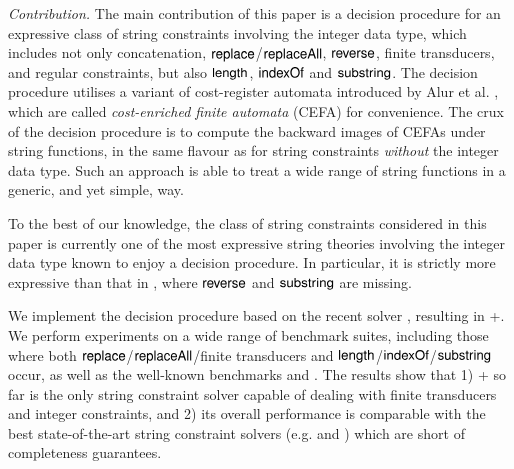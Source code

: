 \noindent\emph{Contribution.} The main contribution of this paper is a decision procedure for an expressive class of string constraints involving the integer data type, which includes not only concatenation, $\mathsf{replace}$/$\mathsf{replaceAll}$, $\mathsf{reverse}$, finite transducers, and regular constraints, but also $\mathsf{length}$, $\mathsf{indexOf}$ and $\mathsf{substring}$. The decision procedure utilises a variant of cost-register automata introduced by Alur et al. \cite{RLJ+13}, which are called \emph{cost-enriched finite automata} (CEFA) for convenience. The crux of the decision procedure is to compute the backward images of CEFAs under string functions,  in the same flavour as \cite{CHL+19} for string constraints \emph{without} the integer data type. Such an approach %
is able to treat %
a wide range of string functions in a generic, and yet simple, way. 

To the best of our knowledge, the class of string constraints considered in this paper is currently one of the most expressive string theories involving the integer data type known to enjoy a decision procedure. In particular, it is strictly more expressive than that in \cite{LB16}, where $\mathsf{reverse}$ and $\mathsf{substring}$ are missing. 



%
We implement the decision procedure based on %
the recent {\ostrich} solver \cite{CHL+19},  resulting in {\ostrich}+.  We perform experiments on a wide range of benchmark suites, including those where both $\mathsf{replace}$/$\mathsf{replaceAll}$/finite transducers and $\mathsf{length}$/$\mathsf{indexOf}$/$\mathsf{substring}$ occur, as well as the well-known benchmarks {\kaluzabench} and {\pyexbench}.
The results show that  %
1) {\ostrich}+ so far is the only string constraint solver capable of dealing with finite transducers and integer constraints, and 2) its overall performance is comparable with the best state-of-the-art string constraint solvers (e.g. {\cvc} and {\zthreetrau}) which are short of completeness guarantees. 

